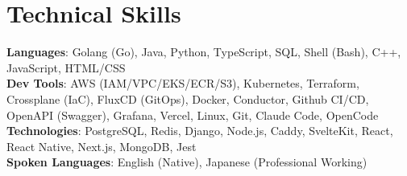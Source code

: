 \section{Technical Skills}
 \begin{itemize}[leftmargin=0.15in, label={}]
    \small{\item{
     \textbf{Languages}{: Golang (Go), Java, Python, TypeScript, SQL, Shell (Bash), C++, JavaScript, HTML/CSS}\\
     \textbf{Dev Tools}{: AWS (IAM/VPC/EKS/ECR/S3), Kubernetes, Terraform, Crossplane (IaC), FluxCD (GitOps), Docker, Conductor, Github CI/CD, OpenAPI (Swagger), Grafana, Vercel, Linux, Git, Claude Code, OpenCode} \\
     \textbf{Technologies}{: PostgreSQL, Redis, Django, Node.js, Caddy, SvelteKit, React, React Native, Next.js, MongoDB, Jest} \\
     \textbf{Spoken Languages}{: English (Native), Japanese (Professional Working)} \\
    }}
 \end{itemize}
